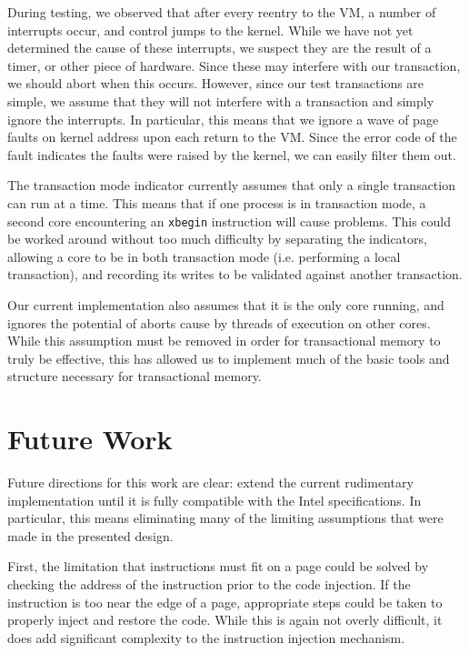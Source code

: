 \documentclass{acm_proc_article-sp}
\begin{document}
During testing, we observed that after every reentry to the VM, a number
of interrupts occur, and control jumps to the kernel. While we have not yet
determined the cause of these interrupts, we suspect they are the result of 
a timer, or other piece of hardware. Since these may interfere with our 
transaction, we should abort when this occurs. However, since our test 
transactions are simple, we assume that they will not interfere with a 
transaction and simply ignore the interrupts. In particular, this means that
we ignore a wave of page faults on kernel address upon each return to the
VM. Since the error code of the fault indicates the faults were raised by
the kernel, we can easily filter them out.   

The transaction mode indicator currently assumes that only a single
transaction can run at a time. This means that if one process is in transaction
mode, a second core encountering an \texttt{xbegin} instruction will cause problems.
This could be worked around without too much difficulty by separating the
indicators, allowing a core to be in both transaction mode (i.e. performing
a local transaction), and recording its writes to be validated against
another transaction.

Our current implementation also assumes that it is the only core running, and
ignores the potential of aborts cause by threads of execution on other cores.
While this assumption must be removed in order for transactional memory to
truly be effective, this has allowed us to implement much of the basic tools
and structure necessary for transactional memory. 
 

\section{Future Work}

Future directions for this work are clear: extend the current rudimentary 
implementation until it is fully compatible with the Intel specifications. In
particular, this means eliminating many of the limiting assumptions that were
made in the presented design.

First, the limitation that instructions must fit on a page could be solved by
checking the address of the instruction prior to the code injection. If the 
instruction is too near the edge of a page, appropriate steps could be taken
to properly inject and restore the code. While this is again not overly 
difficult, it does add significant complexity to the instruction injection
mechanism.
\end{document}
